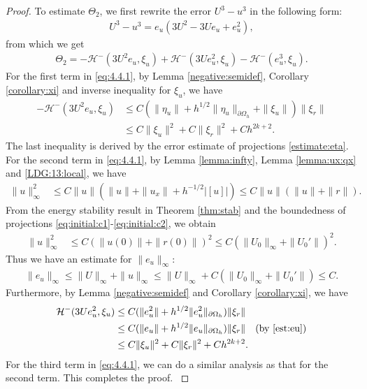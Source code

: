 \documentclass[11pt]{article}
\newcommand{\normb}  [1] {|\![#1]\!|}
\newcommand{\Hcal} {\mathcal{H}}
\numberwithin{equation}{section}
\begin{document}
\begin{proof}
{To estimate $\Theta_2$, we first rewrite the error $U^3-u^3$ in the following form:
\begin{align*}
U^3-u^3=e_u(3U^2-3Ue_u+e_u^2),
\end{align*}
from which we get
\begin{align}\label{eq:4.4.1}
\Theta_2=-\Hcal^-(3U^2e_u, \xi_u)+\Hcal^-(3Ue_u^2, \xi_u)-\Hcal^-(e_u^3, \xi_u).
\end{align}
For the first term in \eqref{eq:4.4.1}, by Lemma \ref{negative:semidef}, Corollary \ref{corollary:xi} and inverse inequality for $\xi_u$, we have
\begin{align*}
-\Hcal^-(3U^2e_u, \xi_u)&\leq C (\|\eta_u\|+h^{1/2}\|\eta_u\|_{\partial \Omega_h}+\|\xi_u\|)\|\xi_r\|\\
&\leq C\|\xi_u\|^2+C\|\xi_r\|^2 +Ch^{2k+2}.
\end{align*}
The last inequality is derived by the error estimate of projections \eqref{estimate:eta}.  For the second term in  \eqref{eq:4.4.1}, by Lemma \ref{lemma:infty}, Lemma \ref{lemma:ux:qx} and \eqref{LDG:13:local}, we have
\begin{align*}
\|u\|_{\infty}^2&\leq C\|u\|(\|u\|+\|u_x\|+h^{-1/2}\normb u )\leq C\|u\|(\|u\|+\|r\|).
\end{align*}
From the energy stability result in Theorem \ref{thm:stab} and the boundedness of projections \eqref{eq:initial:c1}-\eqref{eq:initial:c2}, we obtain
\begin{align*}
\|u\|_{\infty}^2& \leq C (\|u(0)\|+\|r(0)\|)^2\leq C(\|U_0\|_{\infty}+\|U_0'\|)^2.
\end{align*}
Thus we have an estimate for $\|e_u\|_{\infty}$:
\begin{align}\label{est:eu}
\|e_u\|_{\infty}\leq \|U\|_{\infty}+\|u\|_{\infty}\leq \|U\|_{\infty}+C (\|U_0\|_{\infty}+\|U_0'\|)\leq C.
\end{align}
Furthermore, by Lemma \ref{negative:semidef} and Corollary \ref{corollary:xi}, we have
\begin{align*}
\Hcal^-(3Ue_u^2, \xi_u)&\leq C(\|e_u^2\|+h^{1/2}\|e_u^2\|_{\partial \Omega_h})\|\xi_r\|\\
&\leq C(\|e_u\|+h^{1/2}\|e_u\|_{\partial \Omega_h})\|\xi_r\|\quad (\text{by \eqref{est:eu}})\\
&\leq C\|\xi_u\|^2+C\|\xi_r\|^2 +Ch^{2k+2}.
\end{align*}
For the third term in \eqref{eq:4.4.1}, we can do a similar analysis as that for the second term. This completes the proof.
}
\end{proof}
\end{document}
